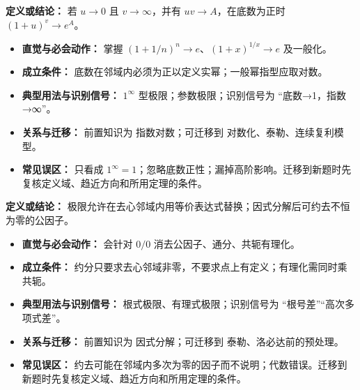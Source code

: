 \begin{knowledgeBox}
\textbf{定义或结论：} 若 $u\to0$ 且 $v\to\infty$，并有 $uv\to A$，在底数为正时 $(1+u)^v\to e^A$。

\begin{itemize}
  \item \textbf{直觉与必会动作：} 掌握 $(1+1/n)^n\to e$、$(1+x)^{1/x}\to e$ 及一般化。
  \item \textbf{成立条件：} 底数在邻域内必须为正以定义实幂；一般幂指型应取对数。
  \item \textbf{典型用法与识别信号：} $1^\infty$ 型极限；参数极限；识别信号为 “底数→1，指数→∞”。
  \item \textbf{关系与迁移：} 前置知识为 指数对数；可迁移到 对数化、泰勒、连续复利模型。
  \item \textbf{常见误区：} 只看成 $1^\infty=1$；忽略底数正性；漏掉高阶影响。迁移到新题时先复核定义域、趋近方向和所用定理的条件。
\end{itemize}
\end{knowledgeBox}

\begin{knowledgeBox}
\textbf{定义或结论：} 极限允许在去心邻域内用等价表达式替换；因式分解后可约去不恒为零的公因子。

\begin{itemize}
  \item \textbf{直觉与必会动作：} 会针对 $0/0$ 消去公因子、通分、共轭有理化。
  \item \textbf{成立条件：} 约分只要求去心邻域非零，不要求点上有定义；有理化需同时乘共轭。
  \item \textbf{典型用法与识别信号：} 根式极限、有理式极限；识别信号为 “根号差”“高次多项式差”。
  \item \textbf{关系与迁移：} 前置知识为 因式分解；可迁移到 泰勒、洛必达前的预处理。
  \item \textbf{常见误区：} 约去可能在邻域内多次为零的因子而不说明；代数错误。迁移到新题时先复核定义域、趋近方向和所用定理的条件。
\end{itemize}
\end{knowledgeBox}

